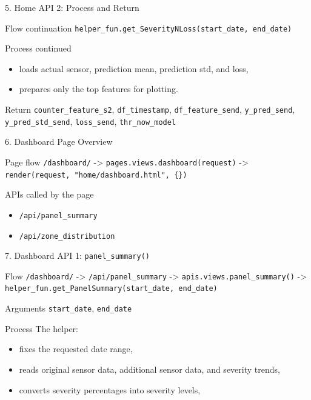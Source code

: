 \documentclass[aspectratio=169]{beamer}
\begin{document}
\begin{frame}{5. Home API 2: Process and Return}
\justifying
\begin{block}{Flow continuation}
\texttt{helper\_fun.get\_SeverityNLoss(start\_date, end\_date)}
\end{block}

\begin{block}{Process continued}
\begin{itemize}
    \item loads actual sensor, prediction mean, prediction std, and loss,
    \item prepares only the top features for plotting.
\end{itemize}
\end{block}

\begin{block}{Return}
\small
\texttt{counter\_feature\_s2}, \texttt{df\_timestamp}, \texttt{df\_feature\_send}, \texttt{y\_pred\_send}, \texttt{y\_pred\_std\_send}, \texttt{loss\_send}, \texttt{thr\_now\_model}
\end{block}
\end{frame}

\begin{frame}{6. Dashboard Page Overview}
\justifying
\begin{block}{Page flow}
\texttt{/dashboard/} -> \texttt{pages.views.dashboard(request)} ->
\texttt{render(request, "home/dashboard.html", \{\})}
\end{block}

\begin{block}{APIs called by the page}
\begin{itemize}
    \item \texttt{/api/panel\_summary}
    \item \texttt{/api/zone\_distribution}
\end{itemize}
\end{block}
\end{frame}

\begin{frame}{7. Dashboard API 1: \texttt{panel\_summary()}}
\justifying
\begin{block}{Flow}
\texttt{/dashboard/} -> \texttt{/api/panel\_summary} ->
\texttt{apis.views.panel\_summary()} ->
\texttt{helper\_fun.get\_PanelSummary(start\_date, end\_date)}
\end{block}

\begin{block}{Arguments}
\texttt{start\_date}, \texttt{end\_date}
\end{block}

\begin{block}{Process}
The helper:
\begin{itemize}
    \item fixes the requested date range,
    \item reads original sensor data, additional sensor data, and severity trends,
    \item converts severity percentages into severity levels,
\end{itemize}
\end{block}

\end{frame}
\end{document}
